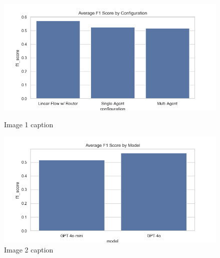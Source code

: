                 \begin{figure}[h]
                \centering
                \begin{minipage}{0.45\textwidth}
                    \centering
                    \includegraphics[width=\textwidth]{images_exp2/bar_avg_f1_by_configuration.png}
                    \caption{Image 1 caption}
                    \label{fig:image1}
                \end{minipage}
                \hfill
                \begin{minipage}{0.45\textwidth}
                    \centering
                    \includegraphics[width=\textwidth]{images_exp2/bar_avg_f1_by_model.png}
                    \caption{Image 2 caption}
                    \label{fig:image2}
                \end{minipage}
                \end{figure}
                
